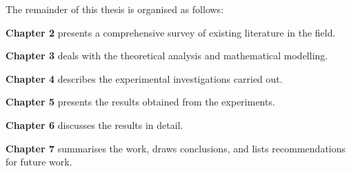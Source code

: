 The remainder of this thesis is organised as follows:

\textbf{Chapter 2} presents a comprehensive survey of existing
literature in the field.

\textbf{Chapter 3} deals with the theoretical analysis and
mathematical modelling.

\textbf{Chapter 4} describes the experimental investigations
carried out.

\textbf{Chapter 5} presents the results obtained from the
experiments.

\textbf{Chapter 6} discusses the results in detail.

\textbf{Chapter 7} summarises the work, draws conclusions, and
lists recommendations for future work.




